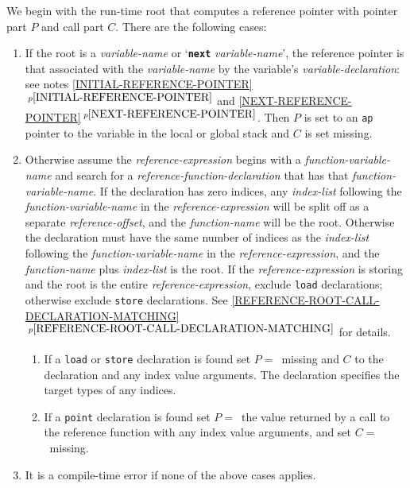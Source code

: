 \documentclass[12pt]{article}
\newcommand{\TT}[1]{{\tt \bfseries #1}}
\newcommand{\itemref}[1]{\ref{#1}$\,^{p\pageref{#1}}$}
\newcommand{\noteref}[1]{\ref{#1}$\,^{p\pageref{#1}}$}
\begin{document}
We begin with the run-time root that computes a reference pointer with
pointer part $P$ and call part $C$.  There are the following cases:
\begin{enumerate}
\item If the root is a {\em variable-name} or
`\TT{next} {\em variable-name}', the reference pointer is that
associated with the {\em variable-name} by the variable's
{\em variable-declaration}: see notes \noteref{INITIAL-REFERENCE-POINTER} and
\noteref{NEXT-REFERENCE-POINTER}.
Then $P$ is set to an {\tt ap} pointer to the variable in
the local or global stack and $C$ is set missing.

\item\label{RUN-TIME-REFERENCE-ROOT-CASE}
Otherwise assume the {\em reference-expression} begins with a
{\em function-variable-name} and search
for a {\em reference-function-declaration} that has that
{\em function-variable-name}.
If the declaration has zero indices, any
{\em index-list} following the {\em function-variable-name}
in the {\em reference-expression}
will be split off as a separate {\em reference-offset}, and the
{\em function-name} will be the root.
Otherwise the declaration must have the same number of indices as
the {\em index-list} following the {\em function-variable-name}
in the {\em reference-expression}, and the {\em function-name}
plus {\em index-list} is the root.
If the {\em reference-expression} is storing and the root is the
entire {\em reference-expression}, exclude
{\tt load} declarations; otherwise exclude {\tt store} declarations.
See \itemref{REFERENCE-ROOT-CALL-DECLARATION-MATCHING} for details.

\begin{enumerate}
\item If a {\tt load} or {\tt store} declaration is found
set $P = $~missing and $C$ to the declaration and any index value arguments.
The declaration specifies the target types of any indices.
\item If a {\tt point} declaration is found
set $P=$~the value returned by a call to the reference function
with any index value arguments, and set $C=$~missing.
\end{enumerate}

\item It is a compile-time error if none of the above cases applies.

\end{enumerate}
\end{document}
